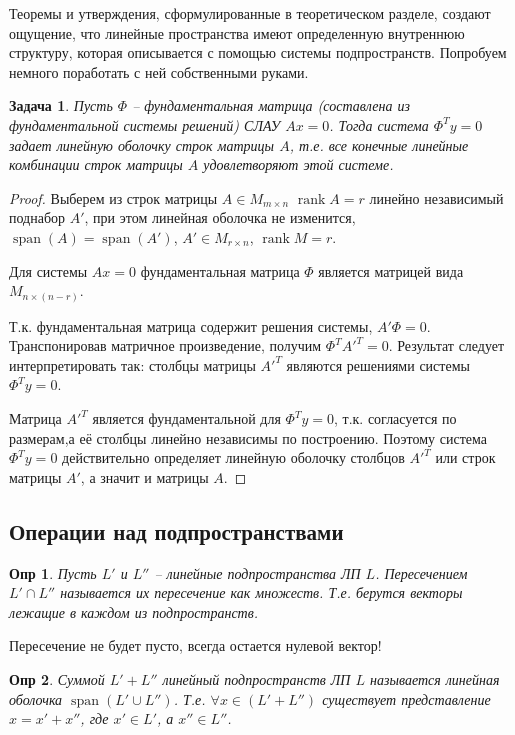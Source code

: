 \documentclass[a4paper,12pt]{article}
\DeclareMathOperator{\spn}{\mathop{span}}
\DeclareMathOperator{\rank}{\mathop{rank}}
\newtheorem*{definition}{Опр}
\newtheorem*{prob}{Задача}
\begin{document}
Теоремы и утверждения, сформулированные в теоретическом разделе, создают ощущение, что линейные пространства имеют определенную внутреннюю структуру, которая описывается с помощью системы подпространств. Попробуем немного поработать с ней собственными руками. 

\begin{prob}
	Пусть $\Phi$ -- фундаментальная матрица (составлена из фундаментальной системы решений) СЛАУ  $Ax = 0$. Тогда система $\Phi^T y = 0$ задает линейную оболочку строк матрицы $A$, т.е. все конечные линейные комбинации строк матрицы $A$ удовлетворяют этой системе.
\end{prob}
\begin{proof}
	Выберем из строк матрицы $A \in M_{m \times n}$ $\rank A = r$ линейно независимый поднабор $A'$, при этом линейная оболочка не изменится, $\spn(A) = \spn(A')$, $A' \in M_{r \times n}$, $\rank M = r$.
	
	Для системы $Ax = 0$ фундаментальная матрица $\Phi$ является матрицей вида $M_{n \times (n-r)}$.
	
	Т.к. фундаментальная матрица содержит решения системы, $A' \Phi = 0$. Транспонировав матричное произведение, получим $\Phi^T A'^T = 0$. Результат следует интерпретировать так: столбцы матрицы $A'^T$ являются решениями системы $\Phi^T y = 0$.
	
	Матрица $A'^T$ является фундаментальной для $\Phi^T y = 0$, т.к. согласуется по размерам,а её столбцы линейно независимы по построению. Поэтому система $\Phi^T y = 0$ действительно определяет линейную оболочку столбцов $A'^T$ или строк матрицы $A'$, а значит и матрицы $A$.
\end{proof}



\subsection{Операции над подпространствами}

\begin{definition}
	Пусть $L'$ и $L''$ --  линейные подпространства ЛП $L$. Пересечением $L' \cap L''$ называется их пересечение как множеств. Т.е. берутся векторы лежащие в каждом из подпространств. 
\end{definition}

Пересечение не будет пусто, всегда остается нулевой вектор!

\begin{definition}
	Суммой $L' + L''$ линейный подпространств ЛП $L$ называется линейная оболочка $\spn(L' \cup L'')$. Т.е. $\forall x \in (L' + L'')$ существует представление $x = x' + x''$, где $x' \in L'$, а $x'' \in L''$.
\end{definition}
\end{document}
